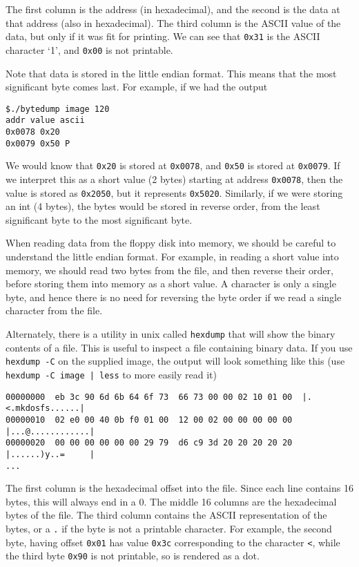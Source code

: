 \documentclass[letterpaper,10pt]{article}
\begin{document}
The first column is the address (in hexadecimal), and the second is the data at that address
(also in hexadecimal). The third column is the ASCII value of the data, but only if it was fit for
printing. We can see that \verb+0x31+ is the ASCII character ‘1’, and \verb+0x00+ is not printable.

Note that data is stored in the little endian format. This means that the most significant
byte comes last. For example, if we had the output
\begin{verbatim}
$./bytedump image 120
addr value ascii
0x0078 0x20
0x0079 0x50 P
\end{verbatim}

We would know that \verb+0x20+ is stored at \verb+0x0078+, and \verb+0x50+ is stored at \verb+0x0079+. If we interpret this as
a short value (2 bytes) starting at address \verb+0x0078+, then the value is stored as \verb+0x2050+, but it
represents \verb+0x5020+. Similarly, if we were storing an int (4 bytes), the bytes would be stored in
reverse order, from the least significant byte to the most significant byte.

When reading data from the floppy disk into memory, we should be careful to understand the
little endian format. For example, in reading a short value into memory, we should read two
bytes from the file, and then reverse their order, before storing them into memory as a short
value. A character is only a single byte, and hence there is no need for reversing the byte order
if we read a single character from the file.

Alternately, there is a utility in unix called \verb=hexdump= that will show the binary contents
of a file. This is useful to inspect a file containing binary data. If you use
\verb=hexdump -C= on the supplied image, the output will look something like this
(use \verb=hexdump -C image | less= to more easily read it)
\begin{verbatim}
00000000  eb 3c 90 6d 6b 64 6f 73  66 73 00 00 02 10 01 00  |.<.mkdosfs......|
00000010  02 e0 00 40 0b f0 01 00  12 00 02 00 00 00 00 00  |...@............|
00000020  00 00 00 00 00 00 29 79  d6 c9 3d 20 20 20 20 20  |......)y..=     |
...
\end{verbatim}
The first column is the hexadecimal offset into the file. Since each line contains 16 bytes,
this will always end in a 0. The middle 16 columns are the hexadecimal bytes of the file.
The third column contains the ASCII representation of the bytes, or a \verb=.= if the byte is
not a printable character.
For example, the second byte, having offset \verb=0x01= has value \verb=0x3c= corresponding to the character
\verb=<=, while the third byte \verb=0x90= is not printable, so is rendered as a dot.
\end{document}
